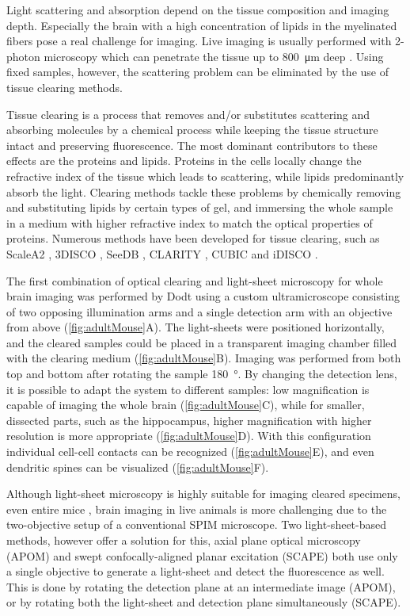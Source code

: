     Light scattering and absorption depend on the tissue composition and imaging depth. Especially the brain with a high concentration of lipids in the myelinated fibers pose a real challenge for imaging. Live imaging is usually performed with 2-photon microscopy which can penetrate the tissue up to \SI{800}{\micro m} deep \cite{katona_fast_2012}. Using fixed samples, however, the scattering problem can be eliminated by the use of tissue clearing methods.

    Tissue clearing is a process that removes and/or substitutes scattering and absorbing molecules by a chemical process while keeping the tissue structure intact and preserving fluorescence. The most dominant contributors to these effects are the proteins and lipids. Proteins in the cells locally change the refractive index of the tissue which leads to scattering, while lipids predominantly absorb the light. Clearing methods tackle these problems by chemically removing and substituting lipids by certain types of gel, and immersing the whole sample in a medium with higher refractive index to match the optical properties of proteins. Numerous methods have been developed for tissue clearing, such as ScaleA2 \cite{hama_scale:_2011}, 3DISCO \cite{erturk_three-dimensional_2012,erturk_three-dimensional_2012-1}, SeeDB \cite{ke_seedb:_2013}, CLARITY \cite{chung_clarity_2013}, CUBIC \cite{susaki_whole-brain_2014} and iDISCO \cite{renier_idisco:_2014}.

    The first combination of optical clearing and light-sheet microscopy for whole brain imaging was performed by Dodt \etal using a custom ultramicroscope consisting of two opposing illumination arms and a single detection arm with an objective from above (\autoref{fig:adultMouse}A). The light-sheets were positioned horizontally, and the cleared samples could be placed in a transparent imaging chamber filled with the clearing medium (\autoref{fig:adultMouse}B). Imaging was performed from both top and bottom after rotating the sample \SI{180}{\degree}. By changing the detection lens, it is possible to adapt the system to different samples: low magnification is capable of imaging the whole brain (\autoref{fig:adultMouse}C), while for smaller, dissected parts, such as the hippocampus, higher magnification with higher resolution is more appropriate (\autoref{fig:adultMouse}D). With this configuration individual cell-cell contacts can be recognized (\autoref{fig:adultMouse}E), and even dendritic spines can be visualized (\autoref{fig:adultMouse}F).

    Although light-sheet microscopy is highly suitable for imaging cleared specimens, even entire mice \cite{tainaka_whole-body_2014}, brain imaging in live animals is more challenging due to the two-objective setup of a conventional SPIM microscope. Two light-sheet-based methods, however offer a solution for this, axial plane optical microscopy (APOM) \cite{li_axial_2014} and swept confocally-aligned planar excitation (SCAPE) \cite{bouchard_swept_2015} both use only a single objective to generate a light-sheet and detect the fluorescence as well. This is done by rotating the detection plane at an intermediate image (APOM), or by rotating both the light-sheet and detection plane simultaneously (SCAPE).


